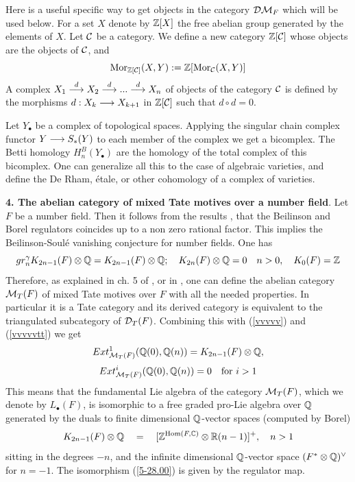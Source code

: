 \documentclass[10pt]{article}
\begin{document}
Here is a useful specific way to get objects in the category ${\cal D}{\cal M}_F$ 
which will be used below. 
For a set $X$ denote by ${\mathbb Z}[X]$ the free abelian group generated by the elements of  $X$. 
Let ${\cal C}$ be a category. We define a new category ${\mathbb Z}[{\cal C}]$ whose 
objects are the objects of ${\cal C}$, and 
$$
{\rm Mor}_{{\mathbb Z}[{\cal C}]}(X, Y):= {\mathbb Z}[{\rm Mor}_{{\cal C}}(X, Y)]
$$  
A complex 
$X_1 \stackrel{d}{\longrightarrow} X_2 \stackrel{d}{\longrightarrow} ... \stackrel{d}{\longrightarrow} X_n$ of objects 
of the category ${\cal C}$ is defined by the morphisms 
 $d: X_k \longrightarrow X_{k+1}$ in ${\mathbb Z}[{\cal C}]$ such that $d \circ d =0$. 

Let $Y_{\bullet}$ be a complex of topological spaces. 
Applying the singular chain complex functor 
$Y \longrightarrow S_{*}(Y)$ to each 
member of the complex we get a bicomplex. The Betti homology  
$H_n^B(Y_{\bullet})$ are 
the homology of the total complex of this bicomplex. 
One can  generalize  all this 
to the case of  algebraic varieties, and 
define  the De Rham, \'etale,  or other  
cohomology of a complex of varieties.  


{\bf 4. The abelian category of mixed Tate
  motives over a number field}. 
Let  $F$ be a  number field. Then it follows from the results \cite{Bo}, \cite{Be1} that 
 the Beilinson and Borel regulators 
coincides up to a non zero rational factor. This implies 
the Beilinson-Soul\'e vanishing conjecture for number fields. One has 
\begin{equation} \label{vvvvvtt}
gr^{\gamma}_nK_{2n-1}(F)\otimes {\mathbb Q}  = K_{2n-1}(F)\otimes {\mathbb Q}; 
\quad K_{2n}(F)\otimes {\mathbb Q} = 0 \quad n>0, \quad K_0(F) = {\mathbb Z}
 \end{equation} 
Therefore, as explained in ch. 5 of \cite{G8}, or in \cite{L1}, 
one can define 
  the abelian category  ${\cal M}_T(F)$ 
of mixed Tate
  motives over  $F$ with  all the needed
  properties. In particular it is a Tate category and its derived category is equivalent to the 
triangulated subcategory of ${\cal D}_T(F)$. 
Combining this with (\ref{vvvvv})  and (\ref{vvvvvtt}) we get  
\begin{equation} \label{8-23/99}
Ext^1_{{\cal M}_T(F)}({\mathbb Q}(0),{\mathbb Q}(n)) = K_{2n-1}(F) \otimes {\mathbb Q}, 
\end{equation}
\begin{equation}\label{8-23.1/99}
Ext^i_{{\cal M}_T(F)}({\mathbb Q}(0),{\mathbb Q}(n)) = 0 \quad \mbox{for $ i>1$}
\end{equation} 
This means that the fundamental Lie algebra of the category ${\cal M}_T(F)$, which we denote by 
 ${L}_{\bullet}(F)$, is isomorphic to 
a free graded pro-Lie algebra over ${\mathbb Q}$ generated by the duals to 
finite dimensional ${\mathbb Q}$-vector spaces (computed by Borel) 
\begin{equation}\label{5-28.00}
K_{2n-1}(F) \otimes {\mathbb Q} \quad = \quad [{\mathbb Z}^{{\rm Hom}(F,{\mathbb C})}\otimes{\mathbb R}(n-1)]^+, \quad n >1
  \end{equation} 
sitting in the degrees $-n$, 
 and the infinite dimensional ${\mathbb Q}$-vector space $(F^* \otimes {\mathbb Q})^{\vee}$ for $n=-1$. 
The isomorphism (\ref{5-28.00}) is given by the regulator map. 
\end{document}

